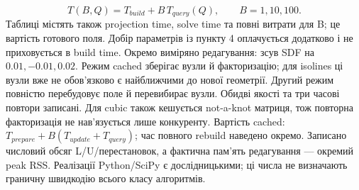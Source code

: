 \documentclass[11pt,a4paper]{article}
\begin{document}
\[
 T(B,Q)=T_{build}+B\,T_{query}(Q),\qquad B=1,10,100.
\]
Таблиці містять також projection time, solve time та повні витрати
для B; це вартість готового поля. Добір параметрів із пункту 4
оплачується додатково і не приховується в build time.
Окремо виміряно редагування: зсув SDF на $0.01,-0.01,0.02$.
Режим cached зберігає вузли й факторизацію; для isolines ці вузли
вже не обов'язково є найближчими до нової геометрії. Другий режим
повністю перебудовує поле й перевибирає вузли. Обидві якості та
три часові повтори записані. Для cubic також кешується not-a-knot
матриця, тож повторна факторизація не нав'язується лише конкуренту.
Вартість cached: $T_{prepare}+B(T_{update}+T_{query})$;
час повного rebuild наведено окремо. Записано числовий обсяг
L/U/перестановок, а фактична пам'ять редагування --- окремий peak RSS.
Реалізації Python/SciPy є дослідницькими; ці числа не визначають
граничну швидкодію всього класу алгоритмів.
\end{document}
